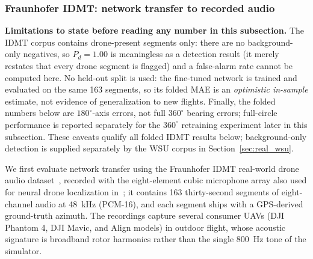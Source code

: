 \documentclass[sensors,article,submit,pdftex,moreauthors]{Definitions/mdpi}
\begin{document}
\subsubsection{Fraunhofer IDMT: network transfer to recorded audio}
\label{sec:real_idmt}
\textbf{Limitations to state before reading any number in this subsection.} The IDMT corpus contains drone-present segments only: there are no background-only negatives, so $P_d=1.00$ is meaningless as a detection result (it merely restates that every drone segment is flagged) and a false-alarm rate cannot be computed here. No held-out split is used: the fine-tuned network is trained and evaluated on the same 163 segments, so its folded MAE is an \emph{optimistic in-sample} estimate, not evidence of generalization to new flights. Finally, the folded numbers below are $180^\circ$-axis errors, not full $360^\circ$ bearing errors; full-circle performance is reported separately for the $360^\circ$ retraining experiment later in this subsection. These caveats qualify all folded IDMT results below; background-only detection is supplied separately by the WSU corpus in Section~\ref{sec:real_wsu}.

We first evaluate network transfer using the Fraunhofer IDMT real-world drone audio dataset~\cite{idmt2025drone}, recorded with the eight-element cubic microphone array also used for neural drone localization in~\cite{yang2025eusipco}; it contains 163 thirty-second segments of eight-channel audio at \SI{48}{\kilo\hertz} (PCM-16), and each segment ships with a GPS-derived ground-truth azimuth. The recordings capture several consumer UAVs (DJI Phantom 4, DJI Mavic, and Align models) in outdoor flight, whose acoustic signature is broadband rotor harmonics rather than the single \SI{800}{\hertz} tone of the simulator.
\end{document}
